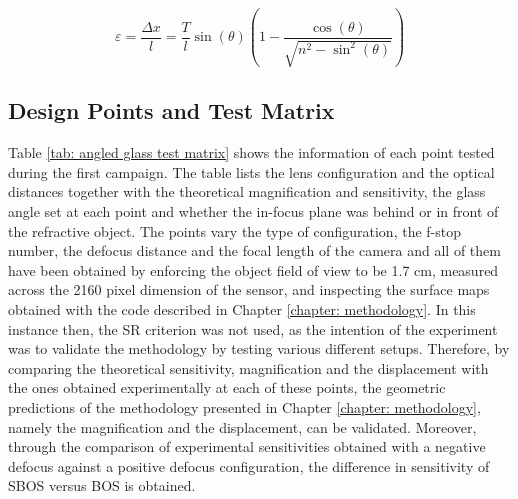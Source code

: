 \begin{equation}
    \label{equation: Displacement of angled glass}
    \varepsilon = \frac{\Delta x}{l} =\frac{T}{l} \sin(\theta) \left( 1 - \frac{\cos(\theta)}{\sqrt{n^2-\sin^2(\theta)}}\right)
\end{equation}

\subsection{Design Points and Test Matrix}
\label{subsection: angled glass matrix}

\par Table \ref{tab: angled glass test matrix} shows the information of each point tested during the first campaign. The table lists the lens configuration and the optical distances together with the theoretical magnification and sensitivity, the glass angle set at each point and whether the in-focus plane was behind or in front of the refractive object. The points vary the type of configuration, the f-stop number, the defocus distance and the focal length of the camera and all of them have been obtained by enforcing the object field of view to be 1.7 cm, measured across the 2160 pixel dimension of the sensor, and inspecting the surface maps obtained with the code described in Chapter \ref{chapter: methodology}. In this instance then, the SR criterion was not used, as the intention of the experiment was to validate the methodology by testing various different setups. Therefore, by comparing the theoretical sensitivity, magnification and the displacement with the ones obtained experimentally at each of these points, the geometric predictions of the methodology presented in Chapter \ref{chapter: methodology}, namely the magnification and the displacement, can be validated. Moreover, through the comparison of experimental sensitivities obtained with a negative defocus against a positive defocus configuration, the difference in sensitivity of SBOS versus BOS is obtained.

